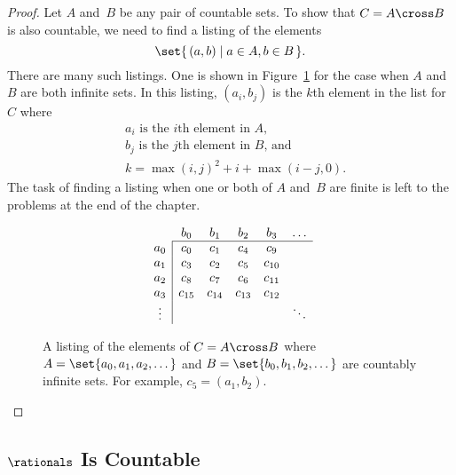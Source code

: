 \begin{proof}
Let $A$ and~$B$ be any pair of countable sets.  To show that $C = A
\cross B$ is also countable, we need to find a listing of the elements
\begin{equation*}
    \set{\, (a, b) \mid a \in A, b \in B \,}.
\end{equation*}
There are many such listings.  One is shown in Figure~\ref{fig:13D6}
for the case when $A$ and~$B$ are both infinite sets.  In this
listing, $(a_i, b_j)$ is the $k$th element in the list for~$C$ where
\begin{align*}
    & \text{$a_i$ is the $i$th element in~$A$,} \\
    & \text{$b_j$ is the $j$th element in~$B$, and} \\
    & k = \max(i,j)^2 + i + \max(i - j, 0).
\end{align*}
The task of finding a listing when one or both of $A$ and~$B$ are
finite is left to the problems at the end of the chapter.

\begin{figure}\redrawntrue

\begin{equation*}
\begin{array}{c|ccccc}
\multicolumn{1}{c}{} & b_0    & b_1       & b_2       & b_3    & \dots \\
\cline{2-6}
a_0    & c_0    & c_1       & c_4       & c_9    \\
a_1    & c_3    & c_2       & c_5       & c_{10} \\
a_2    & c_8    & c_7       & c_6       & c_{11} \\
a_3    & c_{15} & c_{14}    & c_{13}    & c_{12} \\
\vdots &        &           &           &       & \ddots
\end{array}
\end{equation*}

\caption{A listing of the elements of $C = A \cross B$ where $A =
  \set{a_0, a_1, a_2, \dots}$ and $B = \set{b_0, b_1, b_2, \dots}$ are
  countably infinite sets.  For example, $c_5 = (a_1, b_2)$.}

\label{fig:13D6}

\end{figure}

\end{proof}

\subsection{$\rationals$ Is Countable}

